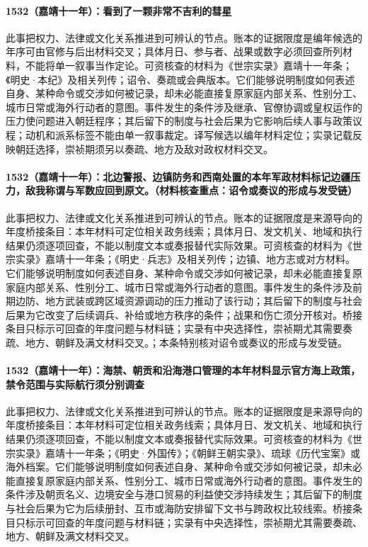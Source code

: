 \paragraph{1532（嘉靖十一年）：看到了一颗非常不吉利的彗星} 此事把权力、法律或文化关系推进到可辨认的节点。账本的证据限度是编年候选的年序可由官修与后出材料交叉；具体月日、参与者、战果或数字必须回查所列材料，不能将单一叙事当作定论。可资核查的材料为《世宗实录》嘉靖十一年条；《明史·本纪》及相关列传；诏令、奏疏或会典版本。它们能够说明制度如何表述自身、某种命令或交涉如何被记录，却未必能直接复原家庭内部关系、性别分工、城市日常或海外行动者的意图。事件发生的条件涉及继承、官僚协调或皇权运作的压力使问题进入朝廷程序；其后留下的制度与社会后果为它影响后续人事与政策议程；动机和派系标签不能由单一叙事裁定。译写候选以编年材料定位；实录记载反映朝廷选择，崇祯期须另以奏疏、地方及敌对政权材料交叉。

\paragraph{1532（嘉靖十一年）：北边警报、边镇防务和西南处置的本年军政材料标记边疆压力，敌我称谓与军数应回到原文。（材料核查重点：诏令或奏议的形成与发受链）} 此事把权力、法律或文化关系推进到可辨认的节点。账本的证据限度是来源导向的年度桥接条目：本年材料可定位相关政务线索；具体月日、发文机关、地域和执行结果仍须逐项回查，不能以制度文本或奏报替代实际效果。可资核查的材料为《世宗实录》嘉靖十一年条；《明史·兵志》及相关列传；边镇、地方志或对方材料。它们能够说明制度如何表述自身、某种命令或交涉如何被记录，却未必能直接复原家庭内部关系、性别分工、城市日常或海外行动者的意图。事件发生的条件涉及前期边防、地方武装或跨区域资源调动的压力推动了该行动；其后留下的制度与社会后果为它改变了后续调兵、补给或地方秩序的条件；战果和伤亡须分开核对。桥接条目只标示可回查的年度问题与材料链；实录有中央选择性，崇祯期尤其需要奏疏、地方、朝鲜及满文材料交叉。；本条特别核对诏令或奏议的形成与发受链。

\paragraph{1532（嘉靖十一年）：海禁、朝贡和沿海港口管理的本年材料显示官方海上政策，禁令范围与实际航行须分别调查} 此事把权力、法律或文化关系推进到可辨认的节点。账本的证据限度是来源导向的年度桥接条目：本年材料可定位相关政务线索；具体月日、发文机关、地域和执行结果仍须逐项回查，不能以制度文本或奏报替代实际效果。可资核查的材料为《世宗实录》嘉靖十一年条；《明史·外国传》；《朝鲜王朝实录》、琉球《历代宝案》或海外档案。它们能够说明制度如何表述自身、某种命令或交涉如何被记录，却未必能直接复原家庭内部关系、性别分工、城市日常或海外行动者的意图。事件发生的条件涉及朝贡名义、边境安全与港口贸易的利益使交涉持续发生；其后留下的制度与社会后果为它为后续册封、互市或海防安排留下文书与跨政权比较线索。桥接条目只标示可回查的年度问题与材料链；实录有中央选择性，崇祯期尤其需要奏疏、地方、朝鲜及满文材料交叉。

